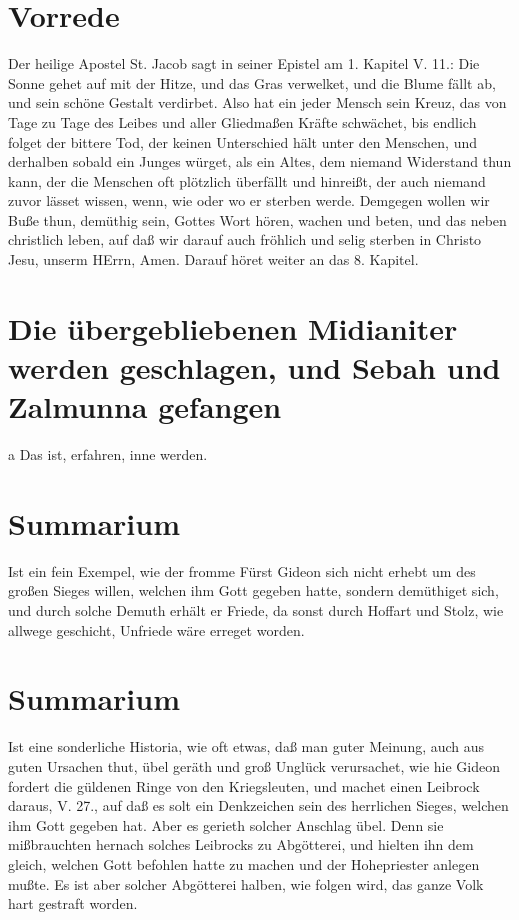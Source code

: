 \section{Vorrede}

Der heilige Apostel St. Jacob sagt in seiner Epistel am 1. Kapitel V. 11.: Die Sonne gehet auf mit der Hitze, und das Gras verwelket, und die Blume fällt ab, und sein schöne Gestalt verdirbet. Also hat ein jeder Mensch sein Kreuz, das von Tage zu Tage des Leibes und aller Gliedmaßen Kräfte schwächet, bis endlich folget der bittere Tod, der keinen Unterschied hält unter den Menschen, und derhalben sobald ein Junges würget, als ein Altes, dem niemand Widerstand thun kann, der die Menschen oft plötzlich überfällt und hinreißt, der auch niemand zuvor lässet wissen, wenn, wie oder wo er sterben werde. Demgegen wollen wir Buße thun, demüthig sein, Gottes Wort hören, wachen und beten, und das neben christlich leben, auf daß wir darauf auch fröhlich und selig sterben in Christo Jesu, unserm HErrn, Amen. Darauf höret weiter an das 8. Kapitel.

\section[Die übergebliebenen Midianiter werden geschlagen, und Sebah und]{Die übergebliebenen Midianiter werden geschlagen, und Sebah und Zalmunna gefangen}
a Das ist, erfahren, inne werden.

\section{Summarium}

Ist ein fein Exempel, wie der fromme Fürst Gideon sich nicht erhebt um des großen Sieges willen, welchen ihm Gott gegeben hatte, sondern demüthiget sich, und durch solche Demuth erhält er Friede, da sonst durch Hoffart und Stolz, wie allwege geschicht, Unfriede wäre erreget worden.
\section{Summarium}

Ist eine sonderliche Historia, wie oft etwas, daß man guter Meinung, auch aus guten Ursachen thut, übel geräth und groß Unglück verursachet, wie hie Gideon fordert die güldenen Ringe von den Kriegsleuten, und machet einen Leibrock daraus, V. 27., auf daß es solt ein Denkzeichen sein des herrlichen Sieges, welchen ihm Gott gegeben hat. Aber es gerieth solcher Anschlag übel. Denn sie mißbrauchten hernach solches Leibrocks zu Abgötterei, und hielten ihn dem gleich, welchen Gott befohlen hatte zu machen und der Hohepriester anlegen mußte. Es ist aber solcher Abgötterei halben, wie folgen wird, das ganze Volk hart gestraft worden.

